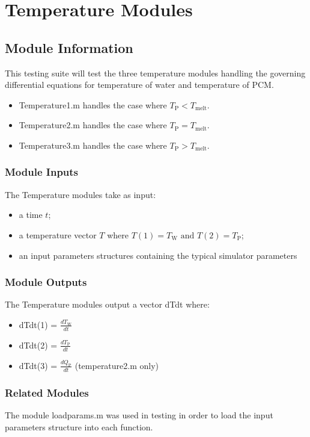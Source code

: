 \documentclass[12pt]{article}
\begin{document}
%
%
\section{Temperature Modules}


\subsection{Module Information}
This testing suite will test the three temperature modules handling the governing 
differential equations for temperature of water and temperature of PCM.
\begin{itemize}
\item Temperature1.m handles the case where $T_{\text{P}} < T_{\text{melt}}$.
\item Temperature2.m handles the case where $T_{\text{P}} = T_{\text{melt}}$.
\item Temperature3.m handles the case where $T_{\text{P}} > T_{\text{melt}}$.
\end{itemize}

\subsubsection{Module Inputs}
The Temperature modules take as input:
\begin{itemize}
\item a time $t$;
\item a temperature vector $T$ where $T(1) = T_{\text{W}} \text{ and } 
T(2) = T_{\text{P}}$;
\item an input parameters structures containing the typical simulator parameters
\end{itemize}

\subsubsection{Module Outputs}
The Temperature modules output a vector dTdt where:
\begin{itemize}
\item dTdt(1) = $\frac{dT_{\text{W}}}{dt}$
\item dTdt(2) = $\frac{dT_{\text{P}}}{dt}$
\item dTdt(3) = $\frac{dQ_{\text{P}}}{dt}$ (temperature2.m only)
\end{itemize}

\subsubsection{Related Modules}
The module loadparams.m was used in testing in order to load the input parameters
 structure into each function.
\end{document}
